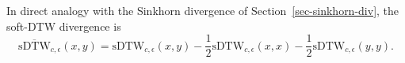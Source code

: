 In direct analogy with the Sinkhorn divergence of Section~\ref{sec-sinkhorn-div}, the soft-DTW divergence is
\begin{equation}\label{eq-soft-dtw-divergence}
\overline{\mathrm{sDTW}}_{c,\epsilon}(x,y)
=
\mathrm{sDTW}_{c,\epsilon}(x,y)
-\frac12\mathrm{sDTW}_{c,\epsilon}(x,x)
-\frac12\mathrm{sDTW}_{c,\epsilon}(y,y).
\end{equation}
